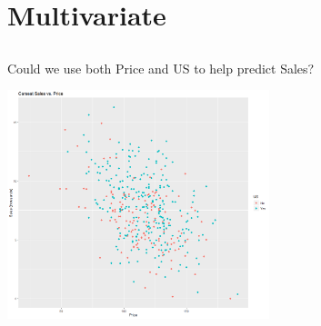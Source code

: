 %
%
%
%
%


\section[Multivariate]{Multivariate}

\subsection{}

\begin{frame}
\bi
	\item Could we use both Price and US to help predict Sales?
\ei
\pause
\begin{center}
	\includegraphics[width = 3in]{SalesPriceUSPoints.png}
\end{center}
\end{frame}

